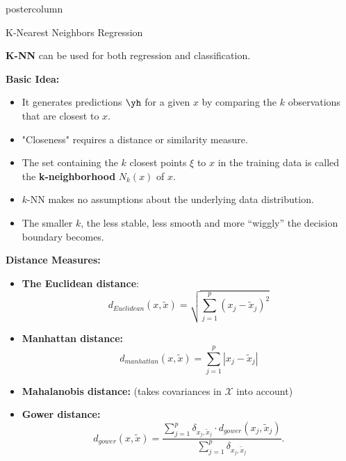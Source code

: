 \documentclass{beamer}
\begin{document}
\begin{frame}[fragile]{}
\begin{columns}
\begin{column}{.31\textwidth}
\begin{beamercolorbox}[center]{postercolumn}
\begin{minipage}{.98\textwidth}
{\begin{myblock}{ }
  \vspace*{1ex}
  
  \end{myblock}
  
  \begin{myblock}{K-Nearest Neighbors Regression}
  
  \textbf{K-NN} can be used for both regression and classification.
  \begin{codebox} \textbf{Basic Idea: }	\end{codebox}
  
  \begin{itemize}[$\bullet$]     
  \setlength{\itemindent}{+.3in}
    \item It generates predictions $\yh$ for a given $x$ by comparing the $k$ observations that are closest to $x$.
    \item "Closeness" requires a distance or similarity measure.
    \item The set containing the $k$ closest points $\xi$ to $x$ in the training data is called  the \textbf{k-neighborhood} $N_k(x)$ of $x$.
    \item $k$-NN makes no assumptions about the underlying data distribution.
    \item The smaller $k$, the less stable, less smooth and more \enquote{wiggly} the decision boundary becomes.
  \end{itemize}
  
  \begin{codebox}
  \textbf{Distance Measures: }
  \end{codebox}
  
  \begin{itemize}[$\bullet$]     
  \setlength{\itemindent}{+.3in}
  \item \textbf{The Euclidean distance}:
    \begin{equation*}
  d_{Euclidean}\left(x, \tilde{x}\right) = \sqrt{\sum_{j=1}^p(x_j- \tilde{x}_j)^2}
  \end{equation*}
  \item \textbf{Manhattan distance:}%
    \begin{equation*}
  d_{manhattan}(x, \tilde{x}) = \sum_{j=1}^p |x_j - \tilde{x}_j|
    \end{equation*}
  \item \textbf{Mahalanobis distance:} (takes covariances in $\mathcal{X}$ into account)
  
  \item
  \textbf{Gower distance:}
  $$d_{gower}(x,\tilde{x}) = \frac{\sum_{j=1}^p \delta_{x_j,\tilde{x}_j} \cdot d_{gower}(x_j,\tilde{x}_j)}{
    \sum_{j=1}^p \delta_{x_j,\tilde{x}_j}}.
  $$
    \end{itemize}
  

\end{myblock}}
\end{minipage}
\end{beamercolorbox}
\end{column}
\end{columns}
\end{frame}
\end{document}
